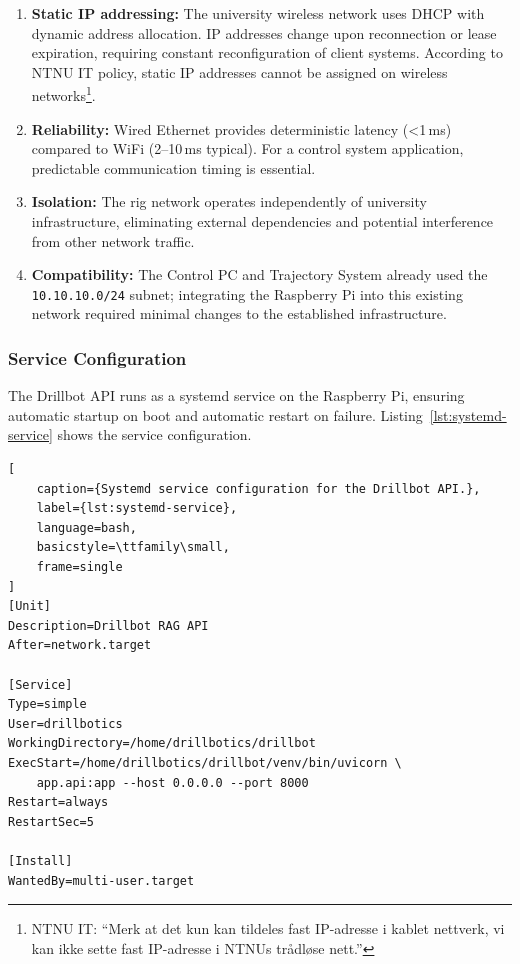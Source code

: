 \begin{enumerate}
    \item \textbf{Static IP addressing:} The university wireless network uses DHCP with dynamic address allocation. IP addresses change upon reconnection or lease expiration, requiring constant reconfiguration of client systems. According to NTNU IT policy, static IP addresses cannot be assigned on wireless networks\footnote{NTNU IT: ``Merk at det kun kan tildeles fast IP-adresse i kablet nettverk, vi kan ikke sette fast IP-adresse i NTNUs tr{\aa}dl{\o}se nett.''}.

    \item \textbf{Reliability:} Wired Ethernet provides deterministic latency (<1\,ms) compared to WiFi (2--10\,ms typical). For a control system application, predictable communication timing is essential.

    \item \textbf{Isolation:} The rig network operates independently of university infrastructure, eliminating external dependencies and potential interference from other network traffic.

    \item \textbf{Compatibility:} The Control PC and Trajectory System already used the \texttt{10.10.10.0/24} subnet; integrating the Raspberry Pi into this existing network required minimal changes to the established infrastructure.
\end{enumerate}

\subsubsection{Service Configuration}

The Drillbot API runs as a systemd service on the Raspberry Pi, ensuring automatic startup on boot and automatic restart on failure. Listing~\ref{lst:systemd-service} shows the service configuration.

\begin{lstlisting}[
    caption={Systemd service configuration for the Drillbot API.},
    label={lst:systemd-service},
    language=bash,
    basicstyle=\ttfamily\small,
    frame=single
]
[Unit]
Description=Drillbot RAG API
After=network.target

[Service]
Type=simple
User=drillbotics
WorkingDirectory=/home/drillbotics/drillbot
ExecStart=/home/drillbotics/drillbot/venv/bin/uvicorn \
    app.api:app --host 0.0.0.0 --port 8000
Restart=always
RestartSec=5

[Install]
WantedBy=multi-user.target
\end{lstlisting}

